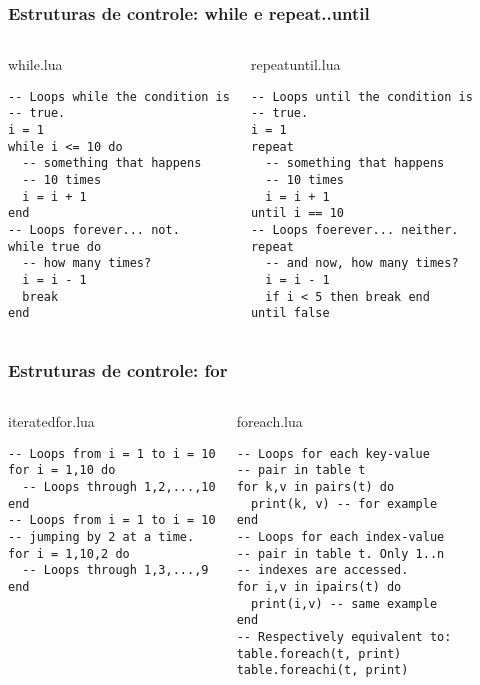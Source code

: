 \documentclass[brazil]{beamer}
\begin{document}

\begin{frame}[fragile]
  \frametitle{Estruturas de controle: while e repeat..until}
  \pause
  \begin{columns}
      \begin{block}{while.lua}
        \begin{lstlisting}
-- Loops while the condition is
-- true.
i = 1
while i <= 10 do
  -- something that happens
  -- 10 times
  i = i + 1
end
-- Loops forever... not.
while true do
  -- how many times?
  i = i - 1
  break
end
        \end{lstlisting}
      \end{block}
    \pause
      \begin{block}{repeatuntil.lua}
        \begin{lstlisting}
-- Loops until the condition is
-- true.
i = 1
repeat
  -- something that happens
  -- 10 times
  i = i + 1
until i == 10
-- Loops foerever... neither.
repeat
  -- and now, how many times?
  i = i - 1
  if i < 5 then break end
until false
        \end{lstlisting}
      \end{block}
  \end{columns}
\end{frame}


\begin{frame}[fragile]
  \frametitle{Estruturas de controle: for}
  \pause
  \begin{columns}
      \begin{block}{iteratedfor.lua}
        \begin{lstlisting}
-- Loops from i = 1 to i = 10
for i = 1,10 do
  -- Loops through 1,2,...,10
end
-- Loops from i = 1 to i = 10
-- jumping by 2 at a time.
for i = 1,10,2 do
  -- Loops through 1,3,...,9
end
        \end{lstlisting}
      \end{block}
    \pause
      \begin{block}{foreach.lua}
        \begin{lstlisting}
-- Loops for each key-value
-- pair in table t
for k,v in pairs(t) do
  print(k, v) -- for example
end
-- Loops for each index-value
-- pair in table t. Only 1..n
-- indexes are accessed.
for i,v in ipairs(t) do
  print(i,v) -- same example
end
-- Respectively equivalent to:
table.foreach(t, print)
table.foreachi(t, print)
        \end{lstlisting}
      \end{block}
  \end{columns}
\end{frame}
\end{document}
